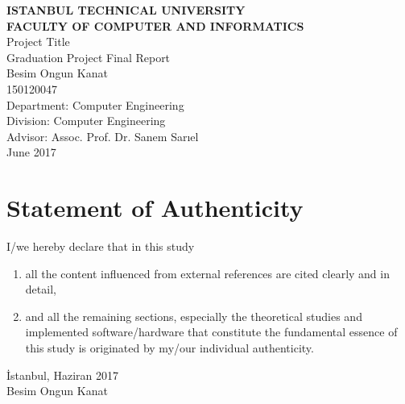 \documentclass[a4paper, 12pt, titlepage]{article}
\title{\thetitle}
\author{\theauthor}
\date{\thedate}
\newcommand{\thetitle}{Project Title}
\newcommand{\theauthor}{Besim Ongun Kanat}
\newcommand{\thedate}{June 2017}
\newcommand{\theturkishdate}{Haziran 2017}
\begin{document}
\shorthandoff{=}


\begin{titlepage}
    \bfseries %
    \sffamily %
    \begin{center}
        \LARGE{\textbf{ISTANBUL TECHNICAL UNIVERSITY \\ 
               FACULTY OF COMPUTER AND INFORMATICS} } \\
        \vspace{5.5cm}
        \LARGE{\thetitle}  \\
        \vspace{4.5cm}
        \Large{Graduation Project Final Report} \\
        \vspace{0.5cm}
        \Large{\theauthor} \\
        \Large{150120047} \\
        \vspace{4cm}
        \large{Department: Computer Engineering} \\
        \large{Division: Computer Engineering} \\
        \vspace{1.5cm}
        \large{Advisor: Assoc. Prof. Dr. Sanem Sarıel} \\
        \vspace{\fill} %
        \large{\normalfont \sffamily \thedate}
    \end{center}
\end{titlepage}

\newpage
\section*{Statement of Authenticity}
I/we hereby declare that in this study
\begin{enumerate}
    \item all the content influenced from external references are cited clearly and in detail,
    \item and all the remaining sections, especially the theoretical studies and implemented software/hardware that constitute the fundamental essence of this study is originated by my/our individual authenticity.
\end{enumerate}
\vspace{1em}
İstanbul, \theturkishdate
\vspace{3em}\\ \theauthor
\end{document}
